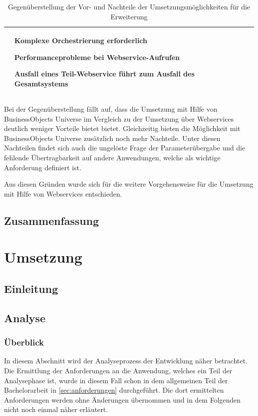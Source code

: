 \begin{onehalfspacing}
{\begin{table}[htbp]
\begin{tabular}{| l | >{\centering\arraybackslash} m{5cm} | >{\centering\arraybackslash} m{5cm} |}
& 


\begin{seList}
\item Komplexe Orchestrierung erforderlich
\item Performanceprobleme bei Webservice-Aufrufen
\item Ausfall eines Teil-Webservice führt zum Ausfall des Gesamtsystems
\end{seList}

\\	\hline
\end{tabular} 
\caption{Gegenüberstellung der Vor- und Nachteile der Umsetzungsmöglichkeiten für die Erweiterung \label{table:vergleich_umsetzung}}
\end{table}
}

Bei der Gegenüberstellung fällt auf, dass die Umsetzung mit Hilfe von BusinessObjects Universe im Vergleich zu der Umsetzung über Webservices deutlich weniger Vorteile bietet bietet. Gleichzeitig bieten die Möglichkeit mit BusinessObjects Universe zusätzlich noch mehr Nachteile. Unter diesen Nachteilen findet sich auch die ungelöste Frage der Parameterübergabe und die fehlende Übertragbarkeit auf andere Anwendungen, welche als wichtige Anforderung definiert ist.

Aus diesen Gründen wurde sich für die weitere Vorgehensweise für die Umsetzung mit Hilfe von Webservices entschieden.



\section{Zusammenfassung}

\chapter{Umsetzung}
\section{Einleitung}
\section{Analyse}

\subsection{Überblick}
In diesem Abschnitt wird der Analyseprozess der Entwicklung näher betrachtet. Die Ermittlung der Anforderungen an die Anwendung, welches ein Teil der Analysephase ist, wurde in diesem Fall schon in dem allgemeinen Teil der Bachelorarbeit in \vref{sec:anforderungen} durchgeführt. Die dort ermittelten Anforderungen werden ohne Änderungen übernommen und in dem Folgenden nicht noch einmal näher erläutert.


\end{onehalfspacing}

